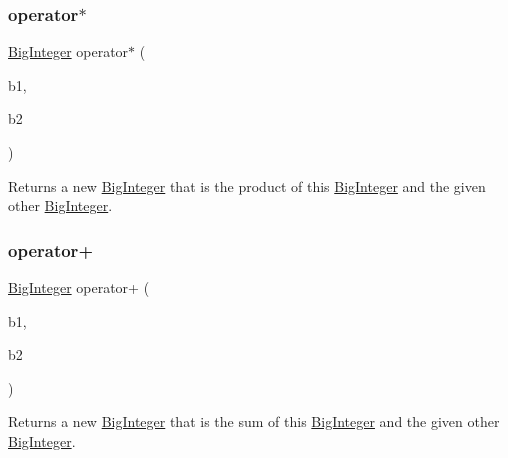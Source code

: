 \mbox{\label{classBigInteger_a8e6b00948ebc54ab67bb17c41007fb3c}} 
\subsubsection{\texorpdfstring{operator$\ast$}{operator*}}
{\footnotesize\ttfamily \mbox{\hyperlink{classBigInteger}{Big\+Integer}} operator$\ast$ (\begin{DoxyParamCaption}\item[{const \mbox{\hyperlink{classBigInteger}{Big\+Integer}} \&}]{b1,  }\item[{const \mbox{\hyperlink{classBigInteger}{Big\+Integer}} \&}]{b2 }\end{DoxyParamCaption})\hspace{0.3cm}{\ttfamily [friend]}}



Returns a new \mbox{\hyperlink{classBigInteger}{Big\+Integer}} that is the product of this \mbox{\hyperlink{classBigInteger}{Big\+Integer}} and the given other \mbox{\hyperlink{classBigInteger}{Big\+Integer}}. 

\mbox{\label{classBigInteger_a60c054a92aedb2aabf4b18d1fece1773}} 
\subsubsection{\texorpdfstring{operator+}{operator+}}
{\footnotesize\ttfamily \mbox{\hyperlink{classBigInteger}{Big\+Integer}} operator+ (\begin{DoxyParamCaption}\item[{const \mbox{\hyperlink{classBigInteger}{Big\+Integer}} \&}]{b1,  }\item[{const \mbox{\hyperlink{classBigInteger}{Big\+Integer}} \&}]{b2 }\end{DoxyParamCaption})\hspace{0.3cm}{\ttfamily [friend]}}



Returns a new \mbox{\hyperlink{classBigInteger}{Big\+Integer}} that is the sum of this \mbox{\hyperlink{classBigInteger}{Big\+Integer}} and the given other \mbox{\hyperlink{classBigInteger}{Big\+Integer}}. 

